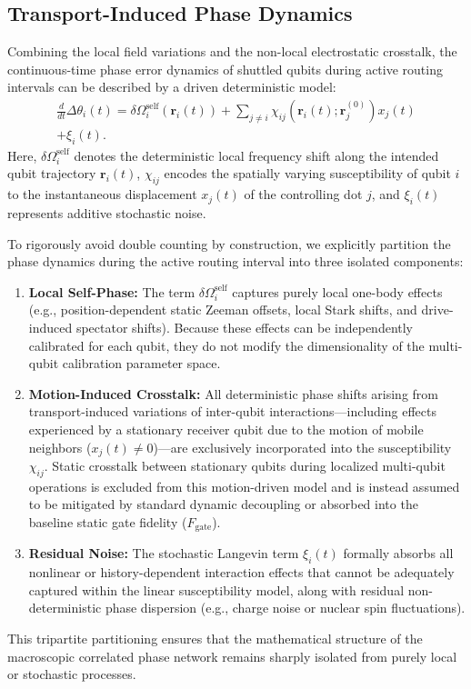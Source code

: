 \documentclass[a4paper,twocolumn,11pt]{quantumarticle}
\begin{document}
\subsection{Transport-Induced Phase Dynamics}
\label{sec:phase_dynamics}

Combining the local field variations and the non-local electrostatic crosstalk, the continuous-time phase error dynamics of shuttled qubits during active routing intervals can be described by a driven deterministic model:
\begin{multline}
    \frac{d}{dt}\Delta\theta_i(t) = \delta\Omega_i^{\text{self}}(\mathbf{r}_i(t)) + \sum_{j \neq i} \chi_{ij}(\mathbf{r}_i(t); \mathbf{r}_j^{(0)}) x_j(t) \\
    + \xi_i(t).
    \label{eq:driven_phase}
\end{multline}
Here, $\delta\Omega_{i}^{\text{self}}$ denotes the deterministic local frequency shift along the intended qubit trajectory $\mathbf{r}_{i}(t)$, $\chi_{ij}$ encodes the spatially varying susceptibility of qubit $i$ to the instantaneous displacement $x_j(t)$ of the controlling dot $j$, and $\xi_{i}(t)$ represents additive stochastic noise.

To rigorously avoid double counting by construction, we explicitly partition the phase dynamics during the active routing interval into three isolated components:
\begin{enumerate}
    \item \textbf{Local Self-Phase:} The term $\delta\Omega_i^{\mathrm{self}}$ captures purely local one-body effects (e.g., position-dependent static Zeeman offsets, local Stark shifts, and drive-induced spectator shifts). Because these effects can be independently calibrated for each qubit, they do not modify the dimensionality of the multi-qubit calibration parameter space.
    \item \textbf{Motion-Induced Crosstalk:} All deterministic phase shifts arising from transport-induced variations of inter-qubit interactions—including effects experienced by a stationary receiver qubit due to the motion of mobile neighbors ($x_j(t) \neq 0$)—are exclusively incorporated into the susceptibility $\chi_{ij}$. Static crosstalk between stationary qubits during localized multi-qubit operations is excluded from this motion-driven model and is instead assumed to be mitigated by standard dynamic decoupling or absorbed into the baseline static gate fidelity ($F_{\text{gate}}$).
    \item \textbf{Residual Noise:} The stochastic Langevin term $\xi_{i}(t)$ formally absorbs all nonlinear or history-dependent interaction effects that cannot be adequately captured within the linear susceptibility model, along with residual non-deterministic phase dispersion (e.g., charge noise or nuclear spin fluctuations).
\end{enumerate}
This tripartite partitioning ensures that the mathematical structure of the macroscopic correlated phase network remains sharply isolated from purely local or stochastic processes.
\end{document}
